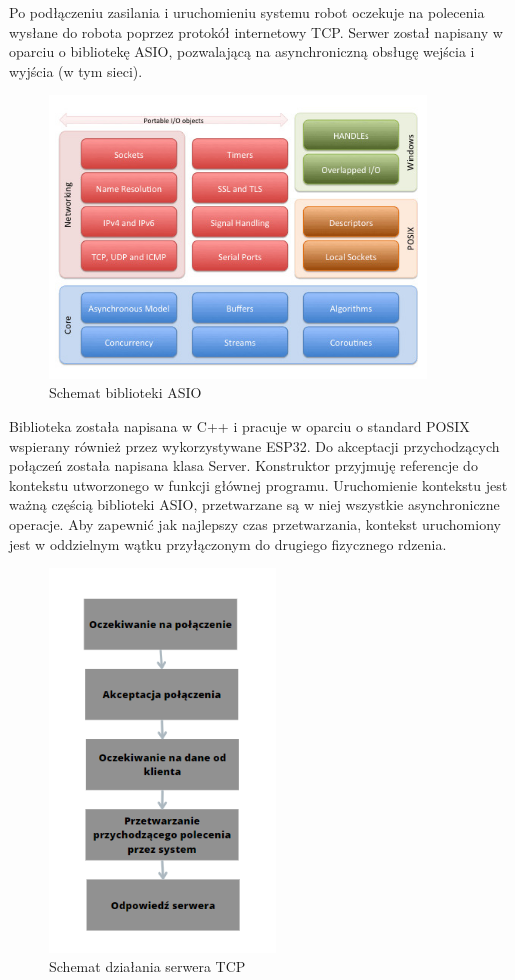 Po podłączeniu zasilania i uruchomieniu systemu robot oczekuje na polecenia wysłane do robota poprzez protokół internetowy TCP. Serwer został napisany w oparciu o bibliotekę ASIO, pozwalającą na asynchroniczną obsługę wejścia i wyjścia (w tym sieci).
\begin{figure}[H]
	\centering
	\includegraphics[width=10cm]{pages/robot/zdjecia/schematASIO.jpg}
	\caption{Schemat biblioteki ASIO \cite{asio}}
	\label{Fig:schematASIO}
\end{figure}
Biblioteka została napisana w C++ i pracuje w oparciu o standard POSIX wspierany również przez wykorzystywane ESP32.
Do akceptacji przychodzących połączeń została napisana klasa Server. Konstruktor przyjmuję referencje do kontekstu utworzonego w funkcji głównej programu. 
Uruchomienie kontekstu jest ważną częścią biblioteki ASIO, przetwarzane są w niej wszystkie asynchroniczne operacje.
Aby zapewnić jak najlepszy czas przetwarzania, kontekst uruchomiony jest w oddzielnym wątku przyłączonym do drugiego fizycznego rdzenia.

\begin{figure}[H]
	\centering
	\includegraphics[width=6cm]{pages/robot/zdjecia/schematTCP.png}
	\caption{Schemat działania serwera TCP}
	\label{Fig:schematSerweraTCP}
\end{figure}

